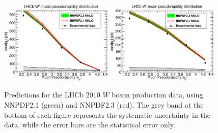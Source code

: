 \begin{figure}[h!]
\centering
\includegraphics[width=0.48\textwidth]{6-LHCimpact/figs/LHCBWZ36PB_0.eps}
\includegraphics[width=0.48\textwidth]{6-LHCimpact/figs/LHCBWZ36PB_1.eps}
\caption[Predictions for the LHCb 2010 $W$ boson production data, using NNPDF2.1 and NNPDF2.3]{Predictions for the LHCb 2010 $W$ boson production data, using NNPDF2.1 (green) and NNPDF2.3 (red). The grey band at the bottom of each figure represents the systematic uncertainty in the data, while the error bars are the statistical error only.}
\label{fig:LHCbWpred}
\end{figure}



